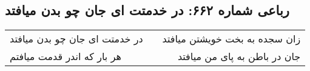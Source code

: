 \begin{center}
\section*{رباعی شماره ۶۶۲: در خدمتت ای جان چو بدن میافتد}
\label{sec:0662}
\begin{longtable}{l p{0.5cm} r}
در خدمتت ای جان چو بدن میافتد
&&
زان سجده به بخت خویشتن میافتد
\\
هر بار که اندر قدمت میافتم
&&
جان در باطن به پای من میافتد
\\
\end{longtable}
\end{center}
